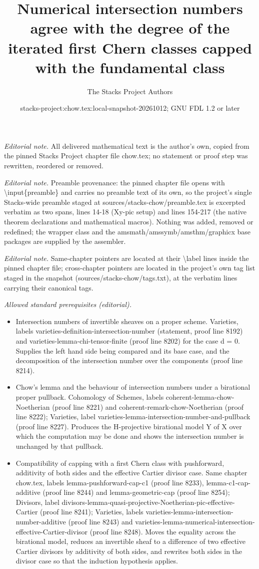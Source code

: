 \documentclass[10pt,a4paper]{amsart}
\title{Numerical intersection numbers agree with the degree of the iterated first Chern classes capped with the fundamental class}
\author{The Stacks Project Authors}
\date{stacks-project:chow.tex:local-snapshot-20261012; GNU FDL 1.2 or later}
\theoremstyle{plain}
\theoremstyle{definition}
\theoremstyle{remark}
\numberwithin{equation}{subsection}
\begin{document}
\maketitle
\noindent\textit{Editorial note.} All delivered mathematical text is the author's own, copied from the pinned Stacks Project chapter file chow.tex; no statement or proof step was rewritten, reordered or removed.\par\medskip
\noindent\textit{Editorial note.} Preamble provenance: the pinned chapter file opens with \textbackslash{}input\{preamble\} and carries no preamble text of its own, so the project's single Stacks-wide preamble staged at sources/stacks-chow/preamble.tex is excerpted verbatim as two spans, lines 14-18 (Xy-pic setup) and lines 154-217 (the native theorem declarations and mathematical macros). Nothing was added, removed or redefined; the wrapper class and the amsmath/amssymb/amsthm/graphicx base packages are supplied by the assembler.\par\medskip
\noindent\textit{Editorial note.} Same-chapter pointers are located at their \textbackslash{}label lines inside the pinned chapter file; cross-chapter pointers are located in the project's own tag list staged in the snapshot (sources/stacks-chow/tags.txt), at the verbatim lines carrying their canonical tags.\par\medskip
\noindent\textit{Allowed standard prerequisites (editorial).}\begin{itemize}
\item Intersection numbers of invertible sheaves on a proper scheme. Varieties, labels varieties-definition-intersection-number (statement, proof line 8192) and varieties-lemma-chi-tensor-finite (proof line 8202) for the case d = 0. Supplies the left hand side being compared and its base case, and the decomposition of the intersection number over the components (proof line 8214).
\item Chow's lemma and the behaviour of intersection numbers under a birational proper pullback. Cohomology of Schemes, labels coherent-lemma-chow-Noetherian (proof line 8221) and coherent-remark-chow-Noetherian (proof line 8222); Varieties, label varieties-lemma-intersection-number-and-pullback (proof line 8227). Produces the H-projective birational model Y of X over which the computation may be done and shows the intersection number is unchanged by that pullback.
\item Compatibility of capping with a first Chern class with pushforward, additivity of both sides and the effective Cartier divisor case. Same chapter chow.tex, labels lemma-pushforward-cap-c1 (proof line 8233), lemma-c1-cap-additive (proof line 8244) and lemma-geometric-cap (proof line 8254); Divisors, label divisors-lemma-quasi-projective-Noetherian-pic-effective-Cartier (proof line 8241); Varieties, labels varieties-lemma-intersection-number-additive (proof line 8243) and varieties-lemma-numerical-intersection-effective-Cartier-divisor (proof line 8248). Moves the equality across the birational model, reduces an invertible sheaf to a difference of two effective Cartier divisors by additivity of both sides, and rewrites both sides in the divisor case so that the induction hypothesis applies.
\end{itemize}\medskip
\end{document}
